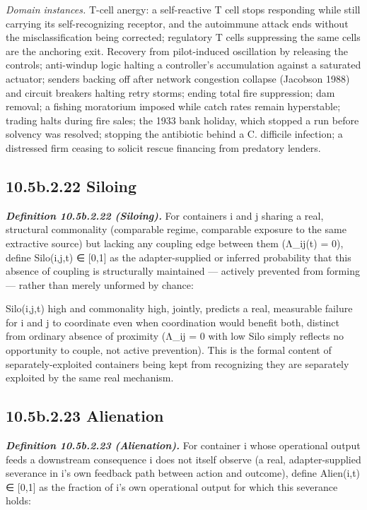 \documentclass[
]{article}
\begin{document}
\emph{Domain instances.} T-cell anergy: a self-reactive T cell stops
responding while still carrying its self-recognizing receptor, and the
autoimmune attack ends without the misclassification being corrected;
regulatory T cells suppressing the same cells are the anchoring exit.
Recovery from pilot-induced oscillation by releasing the controls;
anti-windup logic halting a controller's accumulation against a
saturated actuator; senders backing off after network congestion
collapse (Jacobson 1988) and circuit breakers halting retry storms;
ending total fire suppression; dam removal; a fishing moratorium imposed
while catch rates remain hyperstable; trading halts during fire sales;
the 1933 bank holiday, which stopped a run before solvency was resolved;
stopping the antibiotic behind a C. difficile infection; a distressed
firm ceasing to solicit rescue financing from predatory lenders.

\hypertarget{b.2.22-siloing}{%
\subsection{10.5b.2.22 Siloing}\label{b.2.22-siloing}}

\emph{\textbf{Definition 10.5b.2.22 (Siloing).}} For containers i and j
sharing a real, structural commonality (comparable regime, comparable
exposure to the same extractive source) but lacking any coupling edge
between them (Λ\_ij(t) = 0), define Silo(i,j,t) ∈ {[}0,1{]} as the
adapter-supplied or inferred probability that this absence of coupling
is structurally maintained --- actively prevented from forming ---
rather than merely unformed by chance:

Silo(i,j,t) high and commonality high, jointly, predicts a real,
measurable failure for i and j to coordinate even when coordination
would benefit both, distinct from ordinary absence of proximity (Λ\_ij =
0 with low Silo simply reflects no opportunity to couple, not active
prevention). This is the formal content of separately-exploited
containers being kept from recognizing they are separately exploited by
the same real mechanism.

\hypertarget{b.2.23-alienation}{%
\subsection{10.5b.2.23 Alienation}\label{b.2.23-alienation}}

\emph{\textbf{Definition 10.5b.2.23 (Alienation).}} For container i
whose operational output feeds a downstream consequence i does not
itself observe (a real, adapter-supplied severance in i's own feedback
path between action and outcome), define Alien(i,t) ∈ {[}0,1{]} as the
fraction of i's own operational output for which this severance holds:
\end{document}
